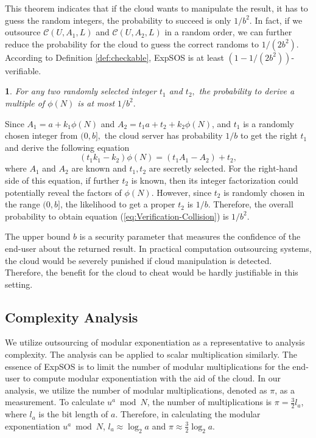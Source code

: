 \documentclass[english,draftcls,onecolumn,11pt]{IEEEtran}
\theoremstyle{definition}
\theoremstyle{plain}
\newtheorem{thm}{\protect\theoremname}
\theoremstyle{plain}
\theoremstyle{definition}
\providecommand{\theoremname}{Theorem}
\begin{document}
This theorem indicates that if the cloud wants to manipulate the result,
it has to guess the random integers, the probability to succeed is
only $1/b^{2}$. In fact, if we outsource $\mathcal{C}(U,A_{1},L)$
and $\mathcal{C}(U,A_{2},L)$ in a random order, we can further reduce
the probability for the cloud to guess the correct randoms to $1/(2b^{2}).$
According to Definition \ref{def:checkable}, ExpSOS is at least $(1-1/(2b^{2}))$-verifiable. 
\begin{thm}
For any two randomly selected integer $t_{1}$ and $t_{2},$ the probability
to derive a multiple of $\phi(N)$ is at most $1/b^{2}.$ \end{thm}
\begin{IEEEproof}
Since $A_{1}=a+k_{1}\phi(N)$ and $A_{2}=t_{1}a+t_{2}+k_{2}\phi(N)$,
and $t_{1}$ is a randomly chosen integer from $(0,b],$ the cloud
server has probability $1/b$ to get the right $t_{1}$ and derive
the following equation
\begin{equation}
(t_{1}k_{1}-k_{2})\phi(N)=(t_{1}A_{1}-A_{2})+t_{2},\label{eq:Verification-Collision}
\end{equation}
where $A_{1}$ and $A_{2}$ are known and $t_{1},t_{2}$ are secretly
selected. For the right-hand side of this equation, if further $t_{2}$
is known, then its integer factorization could potentially reveal
the factors of $\phi(N).$ However, since $t_{2}$ is randomly chosen
in the range $(0,b]$, the likelihood to get a proper $t_{2}$ is
$1/b.$ Therefore, the overall probability to obtain equation (\ref{eq:Verification-Collision})
is $1/b^{2}.$
\end{IEEEproof}
The upper bound $b$ is a security parameter that measures the confidence
of the end-user about the returned result. In practical computation
outsourcing systems, the cloud would be severely punished if cloud
manipulation is detected. Therefore, the benefit for the cloud to
cheat would be hardly justifiable in this setting. 


\subsection{Complexity Analysis}

We utilize outsourcing of modular exponentiation as a representative
to analysis complexity. The analysis can be applied to scalar multiplication
similarly. The essence of ExpSOS is to limit the number of modular
multiplications for the end-user to compute modular exponentiation
with the aid of the cloud. In our analysis, we utilize the number
of modular multiplications, denoted as $\pi$, as a measurement. To
calculate $u^{a}\bmod N$, the number of multiplications is $\pi=\frac{3}{2}l_{a}$,
where $l_{a}$ is the bit length of $a$\cite{zhong2000modular}.
Therefore, in calculating the modular exponentiation $u^{a}\bmod N$,
$l_{a}\approx\log_{2}a$ and $\pi\approx\frac{3}{2}\log_{2}a$.
\end{document}
